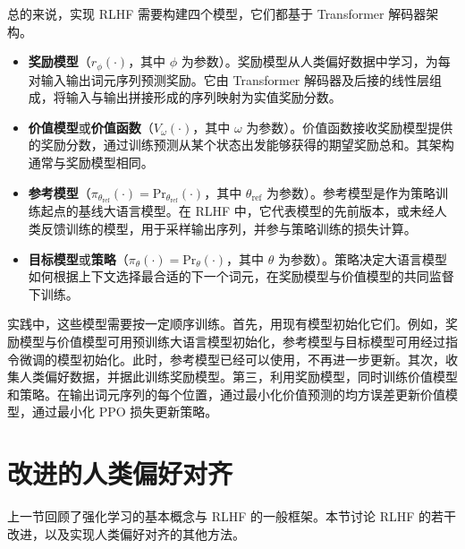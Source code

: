 总的来说，实现 RLHF 需要构建四个模型，它们都基于 Transformer 解码器架构。

\begin{itemize}
\item \vspace{0.5em} \textbf{奖励模型}（$r_{\phi}(\cdot)$，其中 $\phi$ 为参数）。奖励模型从人类偏好数据中学习，为每对输入输出词元序列预测奖励。它由 Transformer 解码器及后接的线性层组成，将输入与输出拼接形成的序列映射为实值奖励分数。
\item \vspace{0.3em} \textbf{价值模型}或\textbf{价值函数}（$V_{\omega}(\cdot)$，其中 $\omega$ 为参数）。价值函数接收奖励模型提供的奖励分数，通过训练预测从某个状态出发能够获得的期望奖励总和。其架构通常与奖励模型相同。
\item \vspace{0.3em} \textbf{参考模型}（$\pi_{\theta_{\mathrm{ref}}}(\cdot) = \mathrm{Pr}_{\theta_{\mathrm{ref}}}(\cdot)$，其中 $\theta_{\mathrm{ref}}$ 为参数）。参考模型是作为策略训练起点的基线大语言模型。在 RLHF 中，它代表模型的先前版本，或未经人类反馈训练的模型，用于采样输出序列，并参与策略训练的损失计算。
\item \vspace{0.3em} \textbf{目标模型}或\textbf{策略}（$\pi_{\theta}(\cdot) = \mathrm{Pr}_{\theta}(\cdot)$，其中 $\theta$ 为参数）。策略决定大语言模型如何根据上下文选择最合适的下一个词元，在奖励模型与价值模型的共同监督下训练。
\end{itemize}
\vspace{0.5em}

实践中，这些模型需要按一定顺序训练。首先，用现有模型初始化它们。例如，奖励模型与价值模型可用预训练大语言模型初始化，参考模型与目标模型可用经过指令微调的模型初始化。此时，参考模型已经可以使用，不再进一步更新。其次，收集人类偏好数据，并据此训练奖励模型。第三，利用奖励模型，同时训练价值模型和策略。在输出词元序列的每个位置，通过最小化价值预测的均方误差更新价值模型，通过最小化 PPO 损失更新策略。


\section{改进的人类偏好对齐}

\noindent 上一节回顾了强化学习的基本概念与 RLHF 的一般框架。本节讨论 RLHF 的若干改进，以及实现人类偏好对齐的其他方法。

